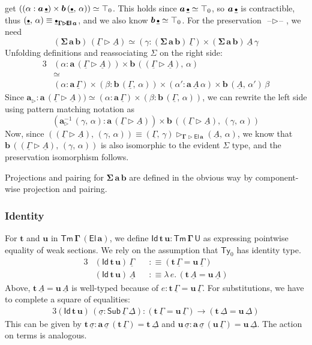 \documentclass[12pt,a4paper,twoside,openany]{book}
\theoremstyle{remark}
\theoremstyle{definition}
\theoremstyle{theorem}
\newcommand{\bs}[1]{\boldsymbol{#1}}
\newcommand{\Sub}{\mathsf{Sub}}
\newcommand{\Tm}{\mathsf{Tm}}
\newcommand{\Ty}{\mathsf{Ty}}
\newcommand{\U}{\mathsf{U}}
\newcommand{\El}{\mathsf{El}}
\newcommand{\Id}{\mathsf{Id}}
\newcommand{\blank}{\mathord{\hspace{1pt}\text{--}\hspace{1pt}}}
\newcommand{\ra}{\rightarrow}
\newcommand{\ext}{\triangleright}
\newcommand{\emptycon}{\scaleobj{.75}\bullet}
\newcommand{\bTm}{\bs{\Tm}}
\newcommand{\bGamma}{\bs{\Gamma}}
\newcommand{\bt}{\bs{t}}
\newcommand{\bu}{\bs{u}}
\newcommand{\ba}{\bs{a}}
\newcommand{\bb}{\bs{b}}
\newcommand{\bU}{\bs{\U}}
\newcommand{\bEl}{\bs{\El}}
\newcommand{\bId}{\bs{\Id}}
\newcommand{\ul}[1]{\underline{#1}}
\newcommand{\ulGamma}{\ul{\Gamma}}
\newcommand{\ulDelta}{\ul{\Delta}}
\newcommand{\ulsigma}{\ul{\sigma}}
\newcommand{\ulemptycon}{\ul{\emptycon}}
\newcommand{\ulA}{\ul{A}}
\newcommand{\defn}{:\equiv}
\begin{document}
get $((\alpha : \ba\,\ulemptycon) \times \bb\,(\ulemptycon,\,\alpha)) \simeq
\top_0$. This holds since $\ba\,\ulemptycon \simeq \top_0$, so
$\ba\,\ulemptycon$ is contractible, thus $(\ulemptycon,\,\alpha) \equiv
\ulemptycon_{\bs{\Gamma \ext \El\,a}}$, and we also know $\bb\,\ulemptycon
\simeq \top_0$. For the preservation $\blank\!\ext\!\blank$, we need
\[
(\bs{\Sigma\,a\,b})\,(\ulGamma \ext \ulA) \simeq (\gamma : (\bs{\Sigma\,a\,b})\,\ulGamma) \times
  (\bs{\Sigma\,a\,b})\,\ulA\,\gamma
\]
Unfolding definitions and reassociating $\Sigma$ on the right side:
\begin{alignat*}{3}
   &(\alpha : \ba\,(\ulGamma \ext \ulA)) \times \bb\,((\ulGamma \ext \ulA),\,\alpha) \\
   &\simeq \\
   &(\alpha : \ba\,\ulGamma)
           \times (\beta : \bb\,(\ulGamma,\,\alpha))
           \times (\alpha' : \ba\,\ulA\,\alpha)
           \times \bb\,(\ulA,\,\alpha')\,\beta
\end{alignat*}
Since $\ba_{\ext} : \ba\,(\ulGamma \ext \ulA)) \simeq (\alpha : \ba\,\ulGamma)
\times (\beta : \bb\,(\ulGamma,\,\alpha))$, we can rewrite the left side using
pattern matching notation as
\[
  (\ba_{\ext}^{-1}\,(\gamma,\,\alpha) : \ba\,(\ulGamma \ext \ulA))
     \times \bb\,((\ulGamma \ext \ulA),\,(\gamma,\,\alpha))
\]
Now, since $((\ulGamma \ext \ulA),\,(\gamma,\,\alpha)) \equiv (\ulGamma,\,\gamma)
\ext_{\bs{\Gamma\ext\El\,a}} (\ulA,\,\alpha)$, we know that $\bb\,((\ulGamma
\ext \ulA),\,(\gamma,\,\alpha))$ is also isomorphic to the evident $\Sigma$
type, and the preservation isomorphism follows.

Projections and pairing for $\bs{\Sigma\,a\,b}$ are defined in the obvious way by
component-wise projection and pairing.

\subsubsection{Identity}

For $\bt$ and $\bu$ in $\bTm\,\bGamma\,(\bEl\,\ba)$, we define $\bId\,\bt\,\bu
\boldsymbol{:} \bTm\,\bGamma\,\bU$ as expressing pointwise equality of weak
sections. We rely on the assumption that $\Ty_0$ has identity type.
\begin{alignat*}{3}
& (\bId\,\bt\,\bu)\,\ulGamma &&\defn (\bt\,\ulGamma = \bu\,\ulGamma)\\
& (\bId\,\bt\,\bu)\,\ulA     &&\defn \lambda\,e.\, (\bt\,\ulA = \bu\,\ulA)
\end{alignat*}
Above, $\bt\,\ulA = \bu\,\ulA$ is well-typed because of $e :
\bt\,\ulGamma = \bu\,\ulGamma$. For substitutions, we have to complete a square
of equalities:
\begin{alignat*}{3}
  (\bId\,\bt\,\bu)\,(\ulsigma : \Sub\,\ulGamma\,\ulDelta) : (\bt\,\ulGamma = \bu\,\ulGamma) \ra
       (\bt\,\ulDelta = \bu\,\ulDelta)
\end{alignat*}
This can be given by $\bt\,\ulsigma : \ba\,\ulsigma\,(\bt\,\ulGamma) =
\bt\,\ulDelta$ and $\bu\,\ulsigma : \ba\,\ulsigma\,(\bu\,\ulGamma) =
\bu\,\ulDelta$. The action on terms is analogous.
\end{document}
